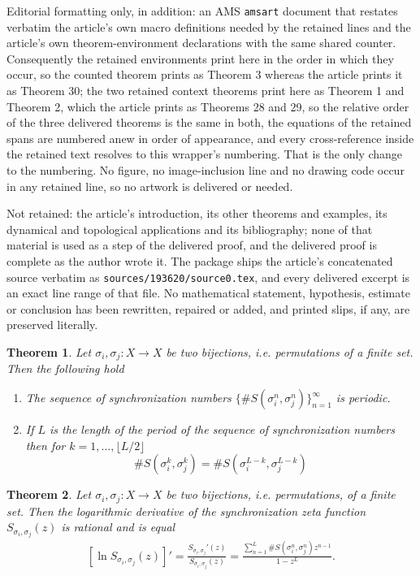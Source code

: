 \documentclass[10pt,a4paper]{amsart}
\theoremstyle{plain}
\newtheorem{thm}{Theorem}
\theoremstyle{definition}
\theoremstyle{remark}
\begin{document}
Editorial formatting only, in addition: an AMS \texttt{amsart} document that restates verbatim the article's own macro definitions needed by the retained lines and the article's own theorem-environment declarations with the same shared counter. Consequently the retained environments print here in the order in which they occur, so the counted theorem prints as Theorem 3 whereas the article prints it as Theorem 30; the two retained context theorems print here as Theorem 1 and Theorem 2, which the article prints as Theorems 28 and 29, so the relative order of the three delivered theorems is the same in both, the equations of the retained spans are numbered anew in order of appearance, and every cross-reference inside the retained text resolves to this wrapper's numbering. That is the only change to the numbering. No figure, no image-inclusion line and no drawing code occur in any retained line, so no artwork is delivered or needed.

Not retained: the article's introduction, its other theorems and examples, its dynamical and topological applications and its bibliography; none of that material is used as a step of the delivered proof, and the delivered proof is complete as the author wrote it. The package ships the article's concatenated source verbatim as \texttt{sources/193620/source0.tex}, and every delivered excerpt is an exact line range of that file. No mathematical statement, hypothesis, estimate or conclusion has been rewritten, repaired or added, and printed slips, if any, are preserved literally.
\begin{thm} \label{thm:synch-numbers-permutations-finite-set}
  Let $\sigma_i, \sigma_j : X \to X$ be two bijections, i.e. permutations of a finite set.
  Then the following hold
  \begin{enumerate}
  \item[\rm (i)] The sequence of synchronization numbers $\{\#S(\sigma_i^n, \sigma_j^n)\}_{n=1}^\infty$ is periodic.
  \item[\rm (ii)] If $L$ is the length of the period of the sequence of synchronization numbers
      then for $k=1,\ldots,\lfloor L/2 \rfloor$
      \begin{equation*} %
        \#S(\sigma_i^k, \sigma_j^k) = \#S(\sigma_i^{L-k}, \sigma_j^{L-k})
      \end{equation*}
  \end{enumerate}
\end{thm}

\begin{thm} \label{thm:sychronization-zeta-log-derivative-rational}
  Let $\sigma_i,\sigma_j: X \to X$ be two bijections, i.e. permutations, of a finite set.
  Then the logarithmic derivative of the synchronization zeta function $S_{\sigma_i, \sigma_j}(z)$
  is rational and is equal
  \begin{align} \label{eq:synchronization-zeta-log-derivative}
    \left[ \ln S_{\sigma_i, \sigma_j}(z) \right]' = \frac{S_{\sigma_i, \sigma_j}'(z)}{S_{\sigma_i, \sigma_j}(z)}
      = \frac{\sum_{n=1}^{L} \#S(\sigma_i^n, \sigma_j^n) z^{n-1}}{1-z^L}.
  \end{align}
\end{thm}
\end{document}
